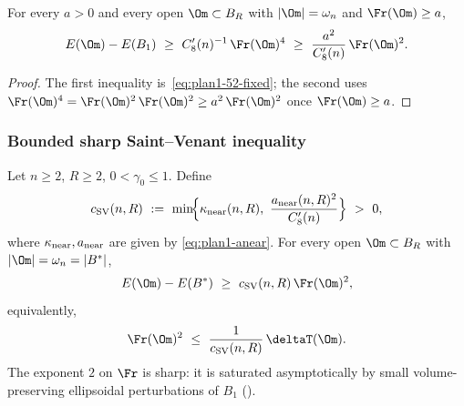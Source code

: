 \begin{lemma}\label{lem:plan1-far}
For every $a>0$ and every open $\Om\subset B_{R}$ with
$|\Om|=\omega_{n}$ and $\Fr(\Om)\ge a$,
\begin{equation}\label{eq:plan1-far}
   E(\Om)-E(B_{1})\ \ge\ C_{8}'(n)^{-1}\,\Fr(\Om)^{4}
   \ \ge\ \frac{a^{2}}{C_{8}'(n)}\,\Fr(\Om)^{2}.
\end{equation}
\end{lemma}

\begin{proof}
The first inequality is~\eqref{eq:plan1-52-fixed}; the second uses
$\Fr(\Om)^{4}=\Fr(\Om)^{2}\,\Fr(\Om)^{2}\ge a^{2}\,\Fr(\Om)^{2}$ once
$\Fr(\Om)\ge a$.
\end{proof}

\subsubsection{Bounded sharp Saint--Venant inequality}
\label{sec:plan1-SV}

\begin{theorem}
\label{thm:plan1-SV}
Let $n\ge 2$, $R\ge 2$, $0<\gamma_{0}\le 1$. Define
\begin{equation}\label{eq:plan1-cSV}
   c_{\rm SV}(n,R)\ :=\
   \min\!\Bigl\{
      \kappa_{\rm near}(n,R),\
      \frac{a_{\rm near}(n,R)^{2}}{C_{8}'(n)}
   \Bigr\}\ >\ 0,
\end{equation}
where $\kappa_{\rm near}, a_{\rm near}$ are given by
\eqref{eq:plan1-anear}. For every open $\Om\subset B_{R}$ with
$|\Om|=\omega_{n}=|B^{*}|$,
\begin{equation}\label{eq:plan1-SV}
   E(\Om)-E(B^{*})\ \ge\ c_{\rm SV}(n,R)\,\Fr(\Om)^{2},
\end{equation}
equivalently,
\begin{equation}\label{eq:plan1-SV-deficit}
   \Fr(\Om)^{2}\ \le\ \frac{1}{c_{\rm SV}(n,R)}\,\deltaT(\Om).
\end{equation}
The exponent $2$ on $\Fr$ is sharp: it is saturated asymptotically by
small volume-preserving ellipsoidal perturbations of $B_{1}$
(\cite[Introduction, p.~2]{BDV}).
\end{theorem}

